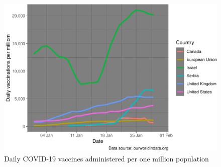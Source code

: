 \documentclass{article}
\begin{document}
\begin{figure}

{\centering \includegraphics{researchNote_files/figure-latex/unnamed-chunk-5-1} 

}

\caption{Daily COVID-19 vaccines administered per one million population}\label{fig:unnamed-chunk-5}
\end{figure}
\end{document}
